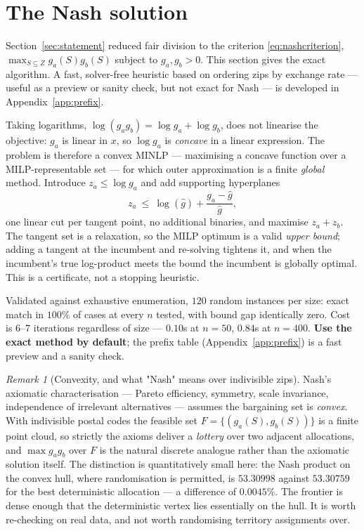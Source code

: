 \documentclass[11pt]{article}
\theoremstyle{remark}\newtheorem*{remark}{Remark}
\begin{document}
\section{The Nash solution}\label{sec:nash}
Section~\ref{sec:statement} reduced fair division to the criterion
\eqref{eq:nashcriterion}, $\max_{S\subseteq Z}g_a(S)g_b(S)$ subject to $g_a,g_b>0$. This
section gives the exact algorithm. A fast, solver-free heuristic based on ordering zips
by exchange rate --- useful as a preview or sanity check, but not exact for Nash --- is
developed in Appendix~\ref{app:prefix}.

\label{sec:exact}
Taking logarithms, $\log(g_ag_b)=\log g_a+\log g_b$, does not linearise the objective:
$g_a$ is linear in $x$, so $\log g_a$ is \emph{concave} in a linear expression. The
problem is therefore a convex MINLP --- maximising a concave function over a
MILP-representable set --- for which outer approximation is a finite \emph{global}
method. Introduce $z_a\le\log g_a$ and add supporting hyperplanes
\begin{equation}\label{eq:tangent}
z_a\ \le\ \log(\hat g)+\frac{g_a-\hat g}{\hat g},
\end{equation}
one linear cut per tangent point, no additional binaries, and maximise $z_a+z_b$. The
tangent set is a relaxation, so the MILP optimum is a valid \emph{upper bound}; adding
a tangent at the incumbent and re-solving tightens it, and when the incumbent's true
log-product meets the bound the incumbent is globally optimal. This is a certificate,
not a stopping heuristic.

\begin{resultbox}
Validated against exhaustive enumeration, $120$ random instances per size: exact match
in $100\%$ of cases at every $n$ tested, with bound gap identically zero. Cost is $6$--$7$
iterations regardless of size --- $0.10$s at $n=50$, $0.84$s at $n=400$. \textbf{Use the
exact method by default}; the prefix table (Appendix~\ref{app:prefix}) is a fast preview
and a sanity check.
\end{resultbox}

\begin{remark}[Convexity, and what "Nash" means over indivisible zips]
Nash's axiomatic characterisation --- Pareto efficiency, symmetry, scale invariance,
independence of irrelevant alternatives --- assumes the bargaining set is
\emph{convex}. With indivisible postal codes the feasible set
$F=\{(g_a(S),g_b(S))\}$ is a finite point cloud, so strictly the axioms deliver a
\emph{lottery} over two adjacent allocations, and $\max g_ag_b$ over $F$ is the natural
discrete analogue rather than the axiomatic solution itself. The distinction is
quantitatively small here: the Nash product on the convex hull, where randomisation is
permitted, is $53.30998$ against $53.30759$ for the best deterministic allocation --- a
difference of $0.0045\%$. The frontier is dense enough that the deterministic vertex
lies essentially on the hull. It is worth re-checking on real data, and not worth
randomising territory assignments over.
\end{remark}
\end{document}
